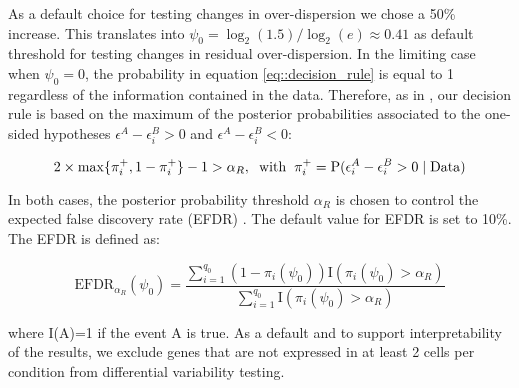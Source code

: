 As a default choice for testing changes in over-dispersion we chose a 50\% increase. This translates into $\psi_0 = \log_2(1.5) / \log_2(e) \approx 0.41$ as default threshold for testing changes in residual over-dispersion. In the limiting case when $\psi_0 = 0$, the probability in equation \eqref{eq::decision_rule} is equal to 1 regardless of the information contained in the data. Therefore, as in \cite{Bochkina2007}, our decision rule is based on the maximum of the posterior probabilities associated to the one-sided hypotheses $\epsilon^A - \epsilon^B_i > 0$ and  $\epsilon^A - \epsilon^B_i < 0$:

\begin{equation} \label{eq::decision_rule2} 2 \times \max\{\pi_i^+, 1-\pi_i^+\} - 1  >\alpha_R, \hspace{0.2cm} \text{with} \hspace{0.2cm} \pi_i^+ = \text{P}(\epsilon_i^{A}-\epsilon_i^{B} > 0 \mid \text{Data})
\end{equation}

In both cases, the posterior probability threshold $\alpha_R$ is chosen to control the expected false discovery rate (EFDR) \citep{Newton2004}. The default value for EFDR is set to 10\%. The EFDR is defined as:

\begin{equation}
\text{EFDR}_{\alpha_R}(\psi_0)=\frac{\sum_{i=1}^{q_0}(1-\pi_i(\psi_0))\text{I}(\pi_i(\psi_0)>\alpha_R)}{\sum_{i=1}^{q_0}\text{I}(\pi_i(\psi_0)>\alpha_R)}
\end{equation}

where I(A)=1 if the event A is true. As a default and to support interpretability of the results, we exclude genes that are not expressed in at least 2 cells per condition from differential variability testing.

\newpage

